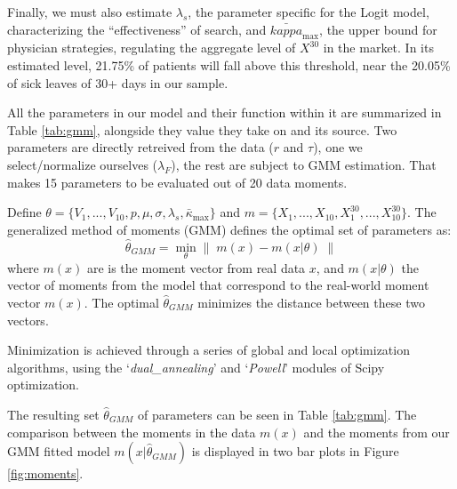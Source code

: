 \documentclass[../main.tex]{subfiles}
\begin{document}
Finally, we must also estimate $\lambda_s$, the parameter specific for the Logit model, characterizing the ``effectiveness'' of search, and $\bar{kappa}_{\max}$, the upper bound for physician strategies, regulating the aggregate level of $X^{30}$ in the market. In its estimated level, 21.75\% of patients will fall above this threshold, near the 20.05\% of sick leaves of 30+ days in our sample.

All the parameters in our model and their function within it are summarized in Table \ref{tab:gmm}, alongside they value they take on and its source. Two parameters are directly retreived from the data ($r$ and $\tau$), one we select/normalize ourselves ($\lambda_F$), the rest are subject to GMM estimation. That makes 15 parameters to be evaluated out of 20 data moments.

Define $\theta = \{V_1, ..., V_{10}, p, \mu, \sigma, \lambda_s, \bar{\kappa}_{\max}\}$ and $m = \{X_1, ..., X_{10}, X_1^{30}, ..., X_{10}^{30}\}$. The generalized method of moments (GMM) defines the optimal set of parameters as:
\begin{equation}
    \hat{\theta}_{GMM} = \min_{\theta} \left\| \; m(x) - m(x|\theta)\; \right\|
\end{equation}
where $m(x)$ are is the moment vector from real data $x$, and $m(x|\theta)$ the vector of moments from the model that correspond to the real-world moment vector $m(x)$. The optimal $\hat{\theta}_{GMM}$ minimizes the distance between these two vectors.

Minimization is achieved through a series of global and local optimization algorithms, using the `\textit{dual\_annealing}' and `\textit{Powell}' modules of Scipy optimization.


The resulting set $\hat{\theta}_{GMM}$ of parameters can be seen in Table \ref{tab:gmm}. The comparison between the moments in the data $m(x)$ and the moments from our GMM fitted model $m(x|\hat{\theta}_{GMM})$ is displayed in two bar plots in Figure \ref{fig:moments}.
\end{document}
